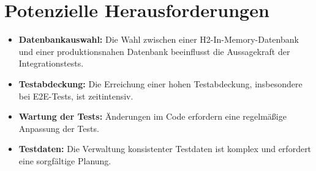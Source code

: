 \chapter{Potenzielle Herausforderungen}
\begin{itemize}
	\item \textbf{Datenbankauswahl:} Die Wahl zwischen einer H2-In-Memory-Datenbank und einer produktionsnahen Datenbank beeinflusst die Aussagekraft der Integrationstests.
	\item \textbf{Testabdeckung:} Die Erreichung einer hohen Testabdeckung, insbesondere bei E2E-Tests, ist zeitintensiv.
	\item \textbf{Wartung der Tests:} Änderungen im Code erfordern eine regelmäßige Anpassung der Tests.
	\item \textbf{Testdaten:} Die Verwaltung konsistenter Testdaten ist komplex und erfordert eine sorgfältige Planung.
\end{itemize}